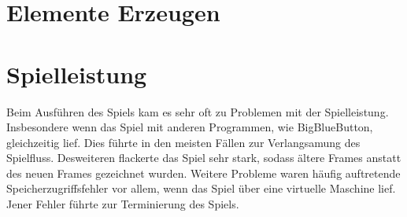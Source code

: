 \section{Elemente Erzeugen}
\label{Elemente Erzeugen}
%

%
\section{Spielleistung}
\label{Spielleistung}
%
Beim Ausführen des Spiels kam es sehr oft zu Problemen mit der Spielleistung. Insbesondere wenn das Spiel mit anderen Programmen, wie BigBlueButton, gleichzeitig lief. Dies führte in den meisten Fällen zur Verlangsamung des Spielfluss. Desweiteren flackerte das Spiel sehr stark, sodass ältere Frames anstatt des neuen Frames gezeichnet wurden. Weitere Probleme waren häufig auftretende Speicherzugriffsfehler vor allem, wenn das Spiel über eine virtuelle Maschine lief. Jener Fehler führte zur Terminierung des Spiels.  
%
